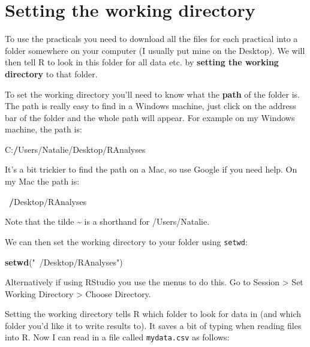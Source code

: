 \documentclass[]{book}
\newenvironment{Shaded}{\begin{snugshade}}{\end{snugshade}}
\newcommand{\KeywordTok}[1]{\textcolor[rgb]{0.13,0.29,0.53}{\textbf{{#1}}}}
\newcommand{\StringTok}[1]{\textcolor[rgb]{0.31,0.60,0.02}{{#1}}}
\newcommand{\ErrorTok}[1]{\textcolor[rgb]{0.64,0.00,0.00}{\textbf{{#1}}}}
\newcommand{\NormalTok}[1]{{#1}}
\begin{document}
\section{Setting the working
directory}\label{setting-the-working-directory}

To use the practicals you need to download all the files for each
practical into a folder somewhere on your computer (I usually put mine
on the Desktop). We will then tell R to look in this folder for all data
etc. by \textbf{setting the working directory} to that folder.

To set the working directory you'll need to know what the \textbf{path}
of the folder is. The path is really easy to find in a Windows machine,
just click on the address bar of the folder and the whole path will
appear. For example on my Windows machine, the path is:

\begin{Shaded}
\begin{Highlighting}[]
\NormalTok{C:}\ErrorTok{/}\NormalTok{Users/Natalie/Desktop/RAnalyses}
\end{Highlighting}
\end{Shaded}

It's a bit trickier to find the path on a Mac, so use Google if you need
help. On my Mac the path is:

\begin{Shaded}
\begin{Highlighting}[]
\NormalTok{~}\ErrorTok{/}\NormalTok{Desktop/RAnalyses}
\end{Highlighting}
\end{Shaded}

Note that the tilde \textasciitilde{} is a shorthand for /Users/Natalie.

We can then set the working directory to your folder using
\texttt{setwd}:

\begin{Shaded}
\begin{Highlighting}[]
\KeywordTok{setwd}\NormalTok{(}\StringTok{"~/Desktop/RAnalyses"}\NormalTok{)}
\end{Highlighting}
\end{Shaded}

Alternatively if using RStudio you use the menus to do this. Go to
Session \textgreater{} Set Working Directory \textgreater{} Choose
Directory.

Setting the working directory tells R which folder to look for data in
(and which folder you'd like it to write results to). It saves a bit of
typing when reading files into R. Now I can read in a file called
\texttt{mydata.csv} as follows:
\end{document}
